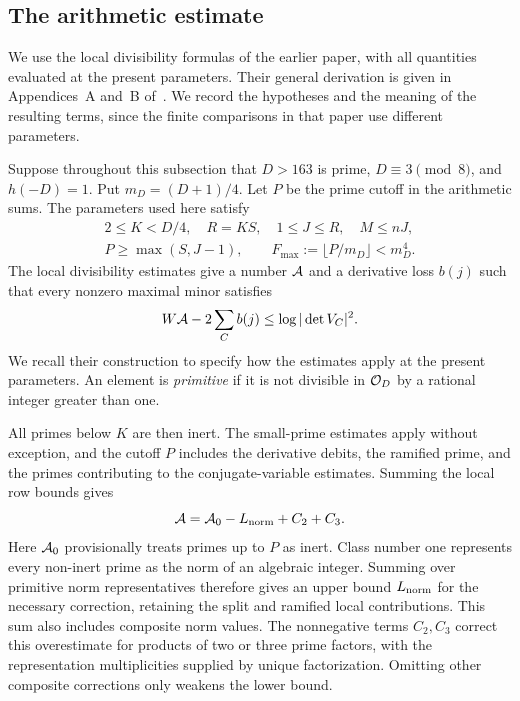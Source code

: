 \subsection{The arithmetic estimate}\label{subsec:primes-import}
We use the local divisibility formulas of the earlier paper, with all
quantities evaluated at the present parameters. Their general derivation is
given in Appendices~A and~B of~\cite{chung498}.
We record the hypotheses and the meaning of the resulting terms, since the
finite comparisons in that paper use different parameters.

Suppose throughout this subsection that $D>163$ is prime,
$D\equiv3\pmod8$, and $h(-D)=1$. Put $m_D=(D+1)/4$.
Let $P$ be the prime cutoff in the arithmetic sums. The parameters used
here satisfy
\begin{equation}\label{eq:arithmetic-hypotheses}
 \begin{gathered}
 2\leq K<D/4,\quad R=KS,\quad 1\leq J\leq R,\quad M\leq nJ,\\
 P\geq\max(S,J-1),\qquad
 F_{\max}:=\lfloor P/m_D\rfloor<m_D^4.
 \end{gathered}
\end{equation}
The local divisibility estimates give a number $\mathcal A$ and a derivative
loss $b(j)$ such that every nonzero maximal minor satisfies
\begin{equation}\label{eq:arithmetic-interface}
 W\mathcal A-2\sum_C b(j)\leq\log|\det V_C|^2.
\end{equation}
We recall their construction to specify how the estimates apply at the
present parameters. An element is \emph{primitive} if it is not divisible
in $\mathcal O_D$ by a rational integer greater than one.

All primes below $K$ are then inert. The small-prime estimates apply without
exception, and the cutoff $P$ includes the derivative debits, the ramified
prime, and the primes contributing to the conjugate-variable estimates.
Summing the local row bounds gives
\begin{equation}\label{eq:arithmetic-parts}
 \mathcal A=\mathcal A_0-L_{\rm norm}+C_2+C_3.
\end{equation}
Here $\mathcal A_0$ provisionally treats primes up to $P$ as inert.
Class number one represents every non-inert prime as the norm of an
algebraic integer. Summing over primitive norm representatives therefore
gives an upper bound $L_{\rm norm}$ for the necessary correction, retaining
the split and ramified local contributions. This sum also includes composite
norm values. The nonnegative terms $C_2,C_3$ correct this overestimate for
products of two or three prime factors, with the representation
multiplicities supplied by unique factorization. Omitting other composite
corrections only weakens the lower bound.

